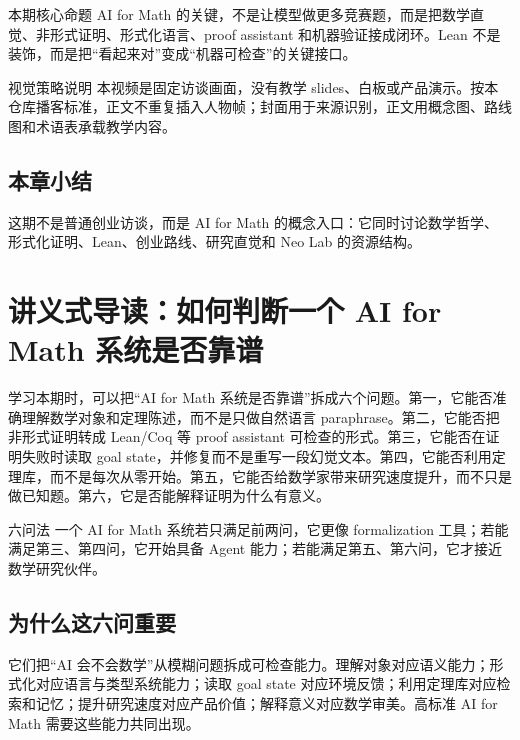 \documentclass[a4paper]{article}
\begin{document}
\begin{importantbox}{本期核心命题}
AI for Math 的关键，不是让模型做更多竞赛题，而是把数学直觉、非形式证明、形式化语言、proof assistant 和机器验证接成闭环。Lean 不是装饰，而是把“看起来对”变成“机器可检查”的关键接口。
\end{importantbox}

\begin{knowledgebox}{视觉策略说明}
本视频是固定访谈画面，没有教学 slides、白板或产品演示。按本仓库播客标准，正文不重复插入人物帧；封面用于来源识别，正文用概念图、路线图和术语表承载教学内容。
\end{knowledgebox}

\subsection{本章小结}

这期不是普通创业访谈，而是 AI for Math 的概念入口：它同时讨论数学哲学、形式化证明、Lean、创业路线、研究直觉和 Neo Lab 的资源结构。


\section{讲义式导读：如何判断一个 AI for Math 系统是否靠谱}

学习本期时，可以把“AI for Math 系统是否靠谱”拆成六个问题。第一，它能否准确理解数学对象和定理陈述，而不是只做自然语言 paraphrase。第二，它能否把非形式证明转成 Lean/Coq 等 proof assistant 可检查的形式。第三，它能否在证明失败时读取 goal state，并修复而不是重写一段幻觉文本。第四，它能否利用定理库，而不是每次从零开始。第五，它能否给数学家带来研究速度提升，而不只是做已知题。第六，它是否能解释证明为什么有意义。

\begin{importantbox}{六问法}
一个 AI for Math 系统若只满足前两问，它更像 formalization 工具；若能满足第三、第四问，它开始具备 Agent 能力；若能满足第五、第六问，它才接近数学研究伙伴。
\end{importantbox}

\subsection{为什么这六问重要}

它们把“AI 会不会数学”从模糊问题拆成可检查能力。理解对象对应语义能力；形式化对应语言与类型系统能力；读取 goal state 对应环境反馈；利用定理库对应检索和记忆；提升研究速度对应产品价值；解释意义对应数学审美。高标准 AI for Math 需要这些能力共同出现。
\end{document}

